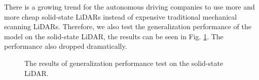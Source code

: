 \documentclass[letterpaper,10 pt,conference]{ieeeconf}  %
\begin{document}
There is a growing trend for the autonomous driving companies to use more and more cheap solid-state LiDARs instead of expensive traditional mechanical scanning LiDARs. Therefore, we also test the generalization performance of the model on the solid-state LiDAR, the results can be seen in Fig. \ref{livox}. The performance also dropped dramatically.

\begin{figure}
    \centering
    \setlength{\belowcaptionskip}{-0.5cm}
    \caption{The results of generalization performance test on the solid-state LiDAR.}
    \label{livox}
\end{figure}
\end{document}
